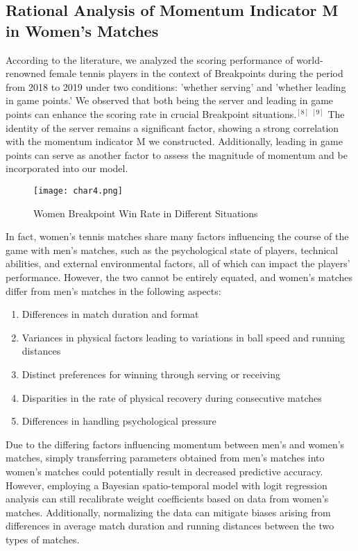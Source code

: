 \documentclass[12pt]{article}
\begin{document}
\subsection{Rational Analysis of Momentum Indicator M in Women's Matches}

According to the literature, we analyzed the scoring performance of world-renowned female tennis players in the context of Breakpoints during the period from 2018 to 2019 under two conditions: 'whether serving' and 'whether leading in game points.' We observed that both being the server and leading in game points can enhance the scoring rate in crucial Breakpoint situations.$^{[8]}\ ^{[9]} $ The identity of the server remains a significant factor, showing a strong correlation with the momentum indicator M we constructed. Additionally, leading in game points can serve as another factor to assess the magnitude of momentum and be incorporated into our model.

\begin{figure}[H]
	\centering
	\texttt{[image: char4.png]}
	\caption{Women Breakpoint Win Rate in Different Situations}\label{tb:char4}
\end{figure}

In fact, women's tennis matches share many factors influencing the course of the game with men's matches, such as the psychological state of players, technical abilities, and external environmental factors, all of which can impact the players' performance. However, the two cannot be entirely equated, and women's matches differ from men's matches in the following aspects:

\begin{enumerate}[\bfseries 1.]
	\item Differences in match duration and format
	\item Variances in physical factors leading to variations in ball speed and running distances
	\item Distinct preferences for winning through serving or receiving
	\item Disparities in the rate of physical recovery during consecutive matches
	\item Differences in handling psychological pressure
\end {enumerate}	

Due to the differing factors influencing momentum between men's and women's matches, simply transferring parameters obtained from men's matches into women's matches could potentially result in decreased predictive accuracy. However, employing a Bayesian spatio-temporal model with logit regression analysis can still recalibrate weight coefficients based on data from women's matches. Additionally, normalizing the data can mitigate biases arising from differences in average match duration and running distances between the two types of matches.
\end{document}
